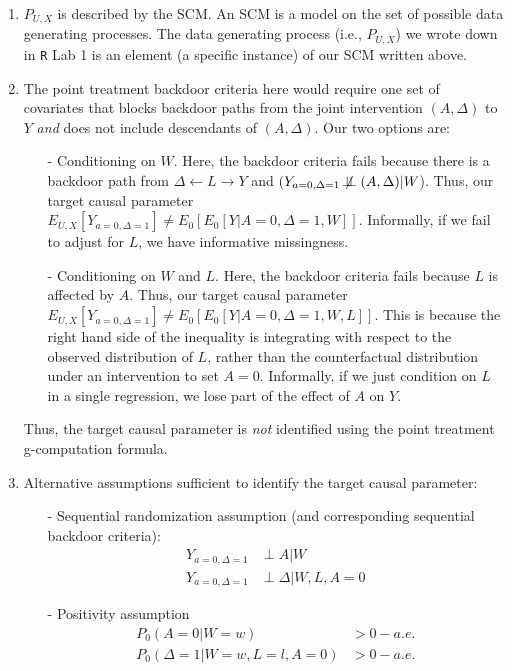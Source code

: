 \documentclass{exam}
\begin{document}
\begin{solution}
\begin{enumerate}
\item $P_{U,X}$ is described by the SCM. An SCM is a model on the set of possible data generating processes. The data generating process (i.e., $P_{U,X}$) we wrote down in \texttt{R} Lab 1 is an element (a specific instance) of our SCM written above.

\item The point treatment backdoor criteria here would require one set of covariates that blocks backdoor paths from the joint intervention $(A, \Delta)$ to $Y$ \textit{and} does not include descendants of $(A, \Delta)$. Our two options are:

\begin{itemize}
\item[-] Conditioning on $W$. Here, the backdoor criteria fails because there is a backdoor path from $\Delta \leftarrow L \rightarrow Y$ and $(Y_{a=0, \Delta =1} \not\!\perp\!\!\!\perp (A, \Delta) | W$). Thus, our target causal parameter $E_{U,X}[Y_{a=0, \Delta = 1}] \neq E_0[E_0[Y|A = 0, \Delta = 1, W]]$. Informally, if we fail to adjust for $L$, we have informative missingness.
\item[-] Conditioning on $W$ and $L$. Here, the backdoor criteria fails because $L$ is affected by $A$. Thus, our target causal parameter $E_{U,X}[Y_{a=0, \Delta = 1}] \neq E_0[E_0[Y|A=0,\Delta=1,W,L]]$. This is because the right hand side of the inequality is integrating with respect to the observed distribution of $L$, rather than the counterfactual distribution under an intervention to set $A=0$. Informally, if we just condition on $L$ in a single regression, we lose part of the effect of $A$ on $Y$.
\end{itemize}

Thus, the target causal parameter is \textit{not} identified using the point treatment g-computation formula.

\item Alternative assumptions sufficient to identify the target causal parameter:

\begin{itemize}
\item[-] Sequential randomization assumption (and corresponding sequential backdoor criteria): 
\begin{align*}
Y_{a=0,\Delta = 1} & \perp A|W \\
Y_{a=0, \Delta = 1} & \perp \Delta | W, L, A=0
\end{align*}
\item[-] Positivity assumption
\begin{align*}
P_0(A = 0|W = w) & > 0 - a.e.\\
P_0(\Delta = 1 | W = w, L = l, A = 0) & > 0 - a.e. \\
\end{align*}
\end{itemize}


\end{enumerate}
\end{solution}
\end{document}
